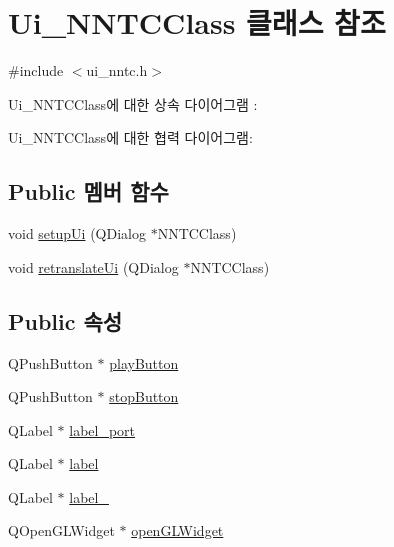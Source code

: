 \hypertarget{class_ui___n_n_t_c_class}{}\section{Ui\+\_\+\+N\+N\+T\+C\+Class 클래스 참조}
\label{class_ui___n_n_t_c_class}


{\ttfamily \#include $<$ui\+\_\+nntc.\+h$>$}



Ui\+\_\+\+N\+N\+T\+C\+Class에 대한 상속 다이어그램 \+: 


Ui\+\_\+\+N\+N\+T\+C\+Class에 대한 협력 다이어그램\+:
\subsection*{Public 멤버 함수}
\begin{DoxyCompactItemize}
\item 
void \mbox{\hyperlink{class_ui___n_n_t_c_class_af15085afc5bdbefb529321782b509792}{setup\+Ui}} (Q\+Dialog $\ast$N\+N\+T\+C\+Class)
\item 
void \mbox{\hyperlink{class_ui___n_n_t_c_class_ad2695a3333b66339fde691ec8384d154}{retranslate\+Ui}} (Q\+Dialog $\ast$N\+N\+T\+C\+Class)
\end{DoxyCompactItemize}
\subsection*{Public 속성}
\begin{DoxyCompactItemize}
\item 
Q\+Push\+Button $\ast$ \mbox{\hyperlink{class_ui___n_n_t_c_class_a6e604f467f5d7264f8d23f0cf54a6fdf}{play\+Button}}
\item 
Q\+Push\+Button $\ast$ \mbox{\hyperlink{class_ui___n_n_t_c_class_a748e190a62458531e66a574cc556e32d}{stop\+Button}}
\item 
Q\+Label $\ast$ \mbox{\hyperlink{class_ui___n_n_t_c_class_a81085bd25c14084fdec83b6527ad7a4c}{label\+\_\+port}}
\item 
Q\+Label $\ast$ \mbox{\hyperlink{class_ui___n_n_t_c_class_a4bb97de507bbb57b6d45f102b06a868f}{label}}
\item 
Q\+Label $\ast$ \mbox{\hyperlink{class_ui___n_n_t_c_class_ae5ebb132466c86f325d6030871f57b5c}{label\+\_}}
\item 
Q\+Open\+G\+L\+Widget $\ast$ \mbox{\hyperlink{class_ui___n_n_t_c_class_a6c33153ad1f40f7f704a54888abfd037}{open\+G\+L\+Widget}}
\end{DoxyCompactItemize}


